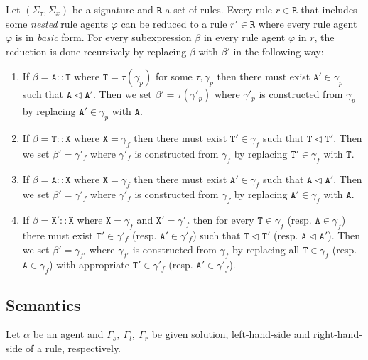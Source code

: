 \documentclass{entcs}
\renewcommand{\~}[0]{\texttildelow}
\begin{document}
\begin{definition}
Let $(\Sigma_\tau,\Sigma_x)$ be a signature and $\mathtt{R}$ a set of rules. Every rule $r\in\mathtt{R}$ that includes some \emph{nested} rule agents $\varphi$ can be reduced to a rule $r'\in\mathtt{R}$ where every rule agent $\varphi$ is in \emph{basic} form. For every subexpression $\beta$ in every rule agent $\varphi$ in $r$, the reduction is done recursively by replacing $\beta$ with $\beta'$ in the following way:
\begin{enumerate}
\item If $\beta=\mathtt{A}::\mathtt{T}$ where $\mathtt{T}=\tau(\gamma_p)$ for some $\tau,\gamma_p$ then there must exist $\mathtt{A}'\in\gamma_p$ such that $\mathtt{A}\lhd\mathtt{A}'$. Then we set $\beta'={\tau}(\gamma'_p)$ where $\gamma'_p$ is constructed from $\gamma_p$ by replacing $\mathtt{A}'\in\gamma_p$ with $\mathtt{A}$.
\item If $\beta=\mathtt{T}::\mathtt{X}$ where $\mathtt{X}=\gamma_f$ then there must exist $\mathtt{T}'\in\gamma_f$ such that $\mathtt{T}\lhd\mathtt{T}'$. Then we set $\beta'=\gamma'_f$ where $\gamma'_f$ is constructed from $\gamma_f$ by replacing $\mathtt{T}'\in\gamma_f$ with $\mathtt{T}$. 
\item If $\beta=\mathtt{A}::\mathtt{X}$ where $\mathtt{X}=\gamma_f$ then there must exist $\mathtt{A}'\in\gamma_f$ such that $\mathtt{A}\lhd\mathtt{A}'$. Then we set $\beta'=\gamma'_f$ where $\gamma'_f$ is constructed from $\gamma_f$ by replacing $\mathtt{A}'\in\gamma_f$ with $\mathtt{A}$. 
\item If $\beta=\mathtt{X}'::\mathtt{X}$ where $\mathtt{X}=\gamma_f$ and $\mathtt{X}'= \gamma'_f$ then for every $\mathtt{T} \in \gamma_f$ (resp. $\mathtt{A} \in \gamma_f$) there must exist $\mathtt{T}' \in \gamma'_f$ (resp. $\mathtt{A}' \in \gamma'_f$) such that $\mathtt{T} \lhd \mathtt{T}'$ (resp. $\mathtt{A} \lhd \mathtt{A}'$). Then we set $\beta'=\gamma_{f'}$ where $\gamma_{f'}$ is constructed from $\gamma_f$ by replacing all $\mathtt{T} \in \gamma_f$ (resp. $\mathtt{A} \in \gamma_f$) with appropriate $\mathtt{T}' \in \gamma'_f$  (resp. $\mathtt{A}' \in \gamma'_f$).
\end{enumerate} 
\end{definition}

\subsection{Semantics}

Let $\alpha$ be an agent and $\Gamma_s,~\Gamma_l,~\Gamma_r$ be given solution, left-hand-side and right-hand-side of a rule, respectively.
\end{document}
